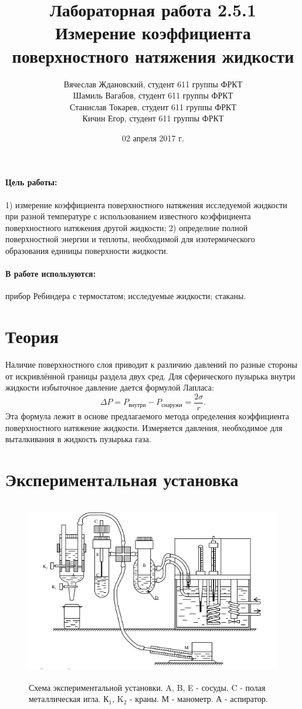 \documentclass[a4paper]{article}
\title{Лабораторная работа 2.5.1 \\Измерение коэффициента поверхностного натяжения жидкости}
\date{02 апреля 2017 г.}
\author{Вячеслав Ждановский, студент 611 группы ФРКТ\\
Шамиль Вагабов, студент 611 группы ФРКТ\\
Станислав Токарев, студент 611 группы ФРКТ\\
Кичин Егор, студент 611 группы ФРКТ}
\begin{document}
	
	\maketitle
	\newpage
	
	\paragraph{Цель работы:} 1) измерение коэффициента поверхностного натяжения исследуемой жидкости при разной температуре с использованием известного коэффициента поверхностного натяжения другой жидкости; 2) определние полной поверхностной энергии и теплоты, необходимой для изотермического образования единицы поверхности жидкости.
	\paragraph{В работе используются:}прибор Ребиндера с термостатом; исследуемые жидкости; стаканы.
	\section{Теория}
	Наличие поверхностного слоя приводит к различию давлений по разные стороны от искривлённой границы раздела двух сред. Для сферического пузырька внутри жидкости избыточное давление дается формулой Лапласа:
	\begin{equation}
	\Delta P = P_\text{внутри} - P_\text{снаружи}=\frac{2\sigma}{r}.
	\end{equation}
	Эта формула лежит в основе предлагаемого метода определения коэффициента поверхностного натяжение жидкости. Измеряется давления, необходимое для выталкивания в жидкость пузырька газа.
	\section{Экспериментальная установка}
	\begin{figure}[ht!]
		\centering
		\includegraphics[height=80mm]{pic1.png}
		\caption{Схема экспериментальной установки. A, B, E - сосуды. C - полая металлическая игла. К$_1$, K$_2$ - краны. М - манометр. А - аспиратор. \label{overflow}}
	\end{figure}
\end{document}
